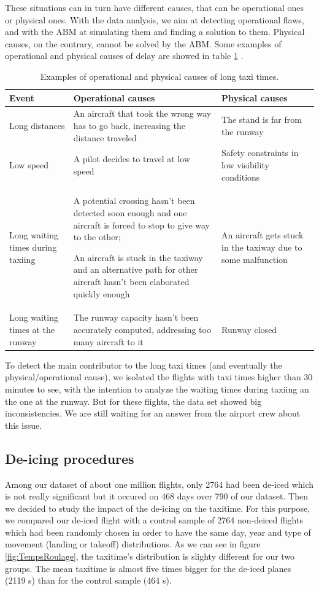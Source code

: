 \documentclass{article}
\begin{document}
These situations can in turn have different causes, that can be operational ones or physical ones. With the data analysis, we aim at detecting operational flaws, and with the ABM at simulating them and finding a solution to them. Physical causes, on the contrary, cannot be solved by the ABM.
Some examples of operational and physical causes of delay are showed in table \ref{causes} .
\begin{table}[h!!!!!!!!!!!!!!!]
	\begin{tabular}{|p{3cm}|p{4cm}|p{4cm}|}
		\hline
		\textbf{Event}& \textbf{Operational causes}& \textbf{Physical causes} \\
		\hline
		Long distances & An aircraft that took the wrong way has to go back, increasing the distance traveled & The stand is far from the runway \\
		\hline
		Low speed & A pilot decides to travel at low speed & Safety constraints in low visibility conditions\\
		\hline
		Long waiting times during taxiing & A potential crossing hasn't been detected soon enough and one aircraft is forced to stop to give way to the other; 
		
		An aircraft is stuck in the taxiway and an alternative path for other aircraft hasn't been elaborated quickly enough & An aircraft gets stuck in the taxiway due to some malfunction \\
		\hline
		Long waiting times at the runway & The runway capacity hasn't been accurately computed, addressing too many aircraft to it & Runway closed\\
		\hline
	\end{tabular}
	\caption{Examples of operational and physical causes of long taxi times.}
	\label{causes}
\end{table}

To detect the main contributor to the long taxi times (and eventually the physical/operational cause), we isolated the flights with taxi times higher than 30 minutes to see, with the intention to analyze the waiting times during taxiing an the one at the runway. But for these flights, the data set showed big inconsistencies. We are still waiting for an answer from the airport crew about this issue.

\subsection{De-icing procedures}
Among our dataset of about one million flights, only 2764 had been de-iced which is not really significant but it occured on 468 days over 790 of our dataset. Then we decided to study the impact of the de-icing on the taxitime. For this purpose, we compared our de-iced flight with a control sample of 2764 non-deiced flights which had been randomly chosen in order to have the same day, year and type of movement (landing or takeoff) distributions. As we can see in figure \ref{fig:TempsRoulage}, the taxitime's distribution is slighty different for our two groups. The mean taxitime is almost five times bigger for the de-iced planes (2119 s) than for the control sample (464 s). 
\end{document}
